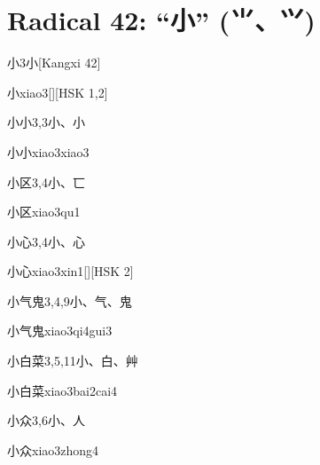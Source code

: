 
\section*{Radical 42: ``⼩'' (⺌、⺍)}

\begin{entry}{小}{3}{⼩}[Kangxi 42]
  \begin{phonetics}{小}{xiao3}[][HSK 1,2]
  \end{phonetics}
\end{entry}

\begin{entry}{小小}{3,3}{⼩、⼩}
  \begin{phonetics}{小小}{xiao3xiao3}
  \end{phonetics}
\end{entry}

\begin{entry}{小区}{3,4}{⼩、⼖}
  \begin{phonetics}{小区}{xiao3qu1}
  \end{phonetics}
\end{entry}

\begin{entry}{小心}{3,4}{⼩、⼼}
  \begin{phonetics}{小心}{xiao3xin1}[][HSK 2]
  \end{phonetics}
\end{entry}

\begin{entry}{小气鬼}{3,4,9}{⼩、⽓、⿁}
  \begin{phonetics}{小气鬼}{xiao3qi4gui3}
  \end{phonetics}
\end{entry}

\begin{entry}{小白菜}{3,5,11}{⼩、⽩、⾋}
  \begin{phonetics}{小白菜}{xiao3bai2cai4}
  \end{phonetics}
\end{entry}

\begin{entry}{小众}{3,6}{⼩、⼈}
  \begin{phonetics}{小众}{xiao3zhong4}
  \end{phonetics}
\end{entry}


